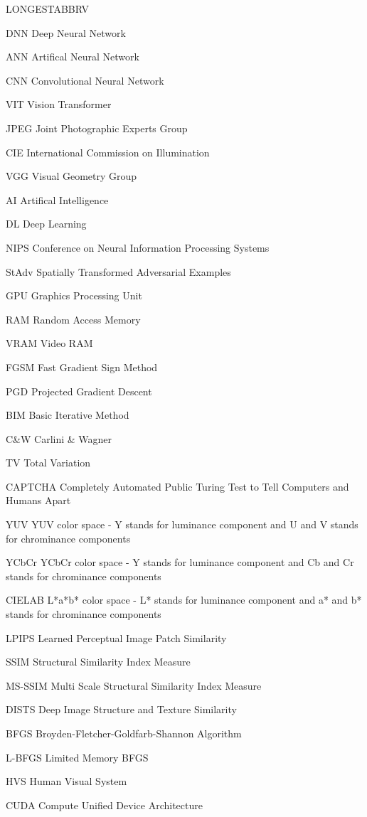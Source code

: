 \begin{theglossary}{LONGESTABBRV}

    \item[DNN] Deep Neural Network
    \item[ANN] Artifical Neural Network
    \item[CNN] Convolutional Neural Network
    \item[VIT] Vision Transformer
    \item[JPEG] Joint Photographic Experts Group
    \item[CIE] International Commission on Illumination
    \item[VGG] Visual Geometry Group
    \item[AI] Artifical Intelligence
    \item[DL] Deep Learning
    \item[NIPS] Conference on Neural Information Processing Systems
    \item[StAdv] Spatially Transformed Adversarial Examples
    \item[GPU] Graphics Processing Unit
    \item[RAM] Random Access Memory
    \item[VRAM] Video RAM
    \item[FGSM] Fast Gradient Sign Method
    \item[PGD] Projected Gradient Descent
    \item[BIM] Basic Iterative Method
    \item[C\&W] Carlini \& Wagner
    \item[TV] Total Variation
    \item[CAPTCHA] Completely Automated Public Turing Test to Tell Computers and Humans Apart
    \item[YUV] YUV color space - Y stands for luminance component and U and V stands for chrominance components
    \item[YCbCr] YCbCr color space - Y stands for luminance component and Cb and Cr stands for chrominance components
    \item[CIELAB] L*a*b* color space - L* stands for luminance component and a* and b* stands for chrominance components
    \item[LPIPS] Learned Perceptual Image Patch Similarity
    \item[SSIM] Structural Similarity Index Measure
    \item[MS-SSIM] Multi Scale Structural Similarity Index Measure
    \item[DISTS] Deep Image Structure and Texture Similarity
    \item[BFGS] Broyden-Fletcher-Goldfarb-Shannon Algorithm
    \item[L-BFGS] Limited Memory BFGS
    \item[HVS] Human Visual System
    \item[CUDA] Compute Unified Device Architecture


\end{theglossary}
